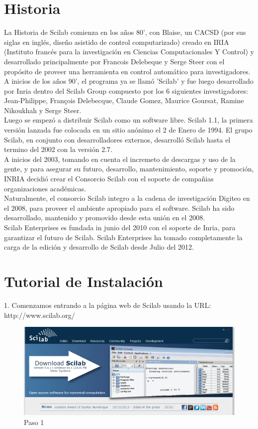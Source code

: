 \documentclass[11pt]{article} %
\begin{document}
\section{Historia}
La Historia de Scilab comienza en los años 80', con Blaise, un CACSD (por sus siglas en inglés, diseño asistido de control computarizado) creado en IRIA (Instituto francés para la investigación en Ciencias Computacionales Y Control) y desarrollado principalmente por Francois Delebeque y Serge Steer con el propósito de proveer una herramienta en control automático para investigadores.
\\%
A inicios de los años 90', el programa ya se llamó 'Scilab' y fue luego desarrollado por Inria dentro del Scilab Group compuesto por los 6 siguientes investigadores: Jean-Philippe, François Delebecque, Claude Gomez, Maurice Goursat, Ramine Nikoukhah y Serge Steer.
\\%
Luego se empezó a distribuir Scilab como un software libre. Scilab 1.1, la primera versión lanzada fue colocada en un sitio anónimo el 2 de Enero de 1994. El grupo Scilab, en conjunto con desarrolladores externos, desarrolló Scilab hasta el termino del 2002 con la versión 2.7.
\\%
A inicios del 2003, tomando en cuenta el incremeto de descargas y uso de la gente, y para asegurar su futuro, desarrollo, mantenimiento, soporte y promoción, INRIA decidió crear el Consorcio Scilab  con el soporte de compañias organizaciones académicas.
\\%
Naturalmente, el consorcio Scilab integro a la cadena de investigación Digiteo en el 2008, para proveer el ambiente apropiado para el software. Scilab ha sido desarrollado, mantenido y promovido desde esta unión en el 2008. 
\\%
Scilab Enterprises es fundada in junio del 2010 con el soporte de Inria, para garantizar el futuro de Scilab. Scilab Enterprises ha tomado completamente la carga de la edición y desarrollo de Scilab desde Julio del 2012.
\section{Tutorial de Instalación}
1.	Comenzamos entrando a la página web de Scilab usando la URL: http://www.scilab.org/

\begin{figure}
  \centering
    \includegraphics{Captura1}
  \caption{Paso 1}
  \label{fig:paso1}
\end{figure}
\end{document}
